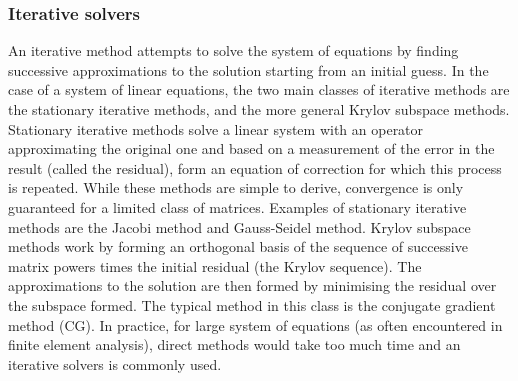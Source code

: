 		\subsubsection*{Iterative solvers}
An iterative method attempts to solve the system of equations by finding successive approximations to the solution starting from an initial guess. In the case of a system of linear equations, the two main classes of iterative methods are the stationary iterative methods, and the more general Krylov subspace methods. Stationary iterative methods solve a linear system with an operator approximating the original one and based on a measurement of the error in the result (called the residual), form an equation of correction for which this process is repeated. While these methods are simple to derive, convergence is only guaranteed for a limited class of matrices. Examples of stationary iterative methods are the Jacobi method and Gauss-Seidel method. Krylov subspace methods work by forming an orthogonal basis of the sequence of successive matrix powers times the initial residual (the Krylov sequence). The approximations to the solution are then formed by minimising the residual over the subspace formed. The typical method in this class is the conjugate gradient method (CG). 
In practice, for large system of equations (as often encountered in finite element analysis), direct methods would take too much time and an iterative solvers is commonly used. 

